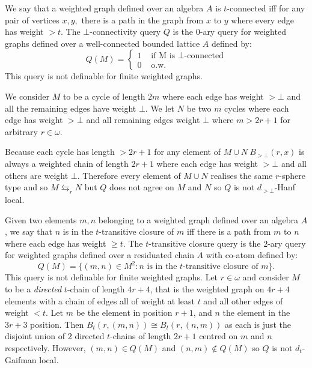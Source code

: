 \documentclass{lmcs} %
\newcommand{\?}{\ensuremath{\mkern0.4\thinmuskip}}
\let\isom=\cong%
\begin{document}
\begin{exa}
    We say that a weighted graph defined over an algebra $A$ is $t$-connected iff for any pair of vertices $x,y,$ there is a path in the graph from $x$ to $y$ where every edge has weight $>t$. The $\bot$-connectivity query $Q$ is the $0$-ary query for weighted graphs defined over a well-connected bounded lattice $A$ defined by: \[Q(M)=\begin{cases}
        1 & \text{ if  M is $\bot$-connected}\\
        0 & \text{ o.w.}
    \end{cases}\] 
    This query is not definable for finite weighted graphs. 

    We consider $M$ to be a cycle of length $2m$ where each edge has weight $>\bot$ and all the remaining edges have weight $\bot$. We let $N$ be two $m$ cycles where each edge has weight $>\bot$ and all remaining edges weight $\bot$ where $m>2r+1$ for arbitrary $r\in\omega$.

    Because each cycle has length $>2r+1$ for any element of $M\cup N\ B_{>\bot}(r,x)$ is always a weighted chain of length $2r+1$ where each edge has weight $>\bot$ and all others are weight $\bot$. Therefore every element of $M\cup N$ realises the same $r$-sphere type and so $M\leftrightarrows_r N$ but $Q$ does not agree on $M$ and $N$ so $Q$ is not $d_{>\bot}$-Hanf local.
\end{exa}

\begin{exa}
    Given two elements $m,n$ belonging to a weighted graph defined over an algebra $A$, we say that $n$ is in the $t$-transitive closure of $m$ iff there is a path from $m$ to $n$ where each edge has weight $\geq t$. The $t$-transitive closure query is the $2$-ary query for weighted graphs defined over a residuated chain $A$ with co-atom defined by: \[Q(M)=\{(m,n)\in M^2:n\text{ is in the }t\text{-transitive closure of }m\}.\]
    This query is not definable for finite weighted graphs.
    Let $r\in\omega$ and consider $M$ to be a \textit{directed} $t$-chain of length $4r+4$, that is the weighted graph on $4r+4$ elements with a chain of edges all of weight at least $t$ and all other edges of weight $<t$. Let $m$ be the element in position $r+1$, and $n$ the element in the $3r+3$ position. Then $B_t(r,(m,n))\isom B_t(r,(n,m))$ as each is just the disjoint union of $2$ directed $t$-chains of length $2r+1$ centred on $m$ and $n$ respectively. However, $(m,n)\in Q(M)$ and $(n,m)\not\in Q(M)$ so $Q$ is not $d_{t}$-Gaifman local.
\end{exa}
\end{document}
